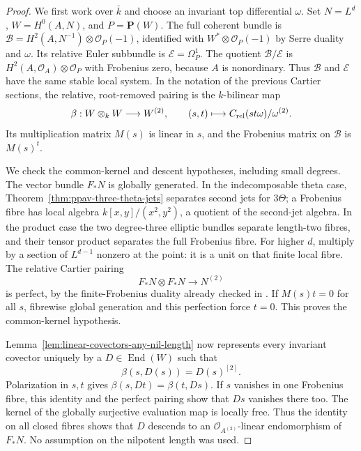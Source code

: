 \begin{proof}
We first work over $\bar k$ and choose an invariant top differential
$\omega$. Set $N=L^d$, $W=H^0(A,N)$, and $P=\mathbf P(W)$.
The full coherent bundle is
$\mathcal B=H^2(A,N^{-1})\otimes\mathcal O_P(-1)$, identified with
$W^*\otimes\mathcal O_P(-1)$ by Serre duality and $\omega$.
Its relative Euler subbundle is $\mathcal E=\Omega_P^1$.
The quotient $\mathcal B/\mathcal E$ is $H^2(A,\mathcal O_A)\otimes
\mathcal O_P$ with Frobenius zero, because $A$ is nonordinary.
Thus $\mathcal B$ and $\mathcal E$ have the same stable local system.
In the notation of the previous Cartier sections, the relative,
root-removed pairing is the $k$-bilinear map
\[
 \beta:W\otimes_kW\longrightarrow W^{(2)},\qquad
           (s,t)\longmapsto C_{\rm rel}(st\omega)/\omega^{(2)}.
\]
Its multiplication matrix $M(s)$ is linear in $s$, and the Frobenius
matrix on $\mathcal B$ is $M(s)^t$.

We check the common-kernel and descent hypotheses, including small
degrees. The vector bundle $F_*N$ is globally generated. In the
indecomposable theta case, Theorem~\ref{thm:ppav-three-theta-jets}
separates second jets for $3\Theta$; a Frobenius fibre has local
algebra $k[x,y]/(x^2,y^2)$, a quotient of the second-jet algebra.
In the product case the two degree-three elliptic bundles separate
length-two fibres, and their tensor product separates the full
Frobenius fibre. For higher $d$, multiply by a section of $L^{d-1}$
nonzero at the point: it is a unit on that finite local fibre.
The relative Cartier pairing
\[
                    F_*N\otimes F_*N\longrightarrow N^{(2)}
\]
is perfect, by the finite-Frobenius duality already checked in
\citet[Proposition~1.3.7 and Theorem~1.3.8, pp.~26--28]{BrionKumar2005}.
If $M(s)t=0$ for all $s$, fibrewise global generation and this
perfection force $t=0$. This proves the common-kernel hypothesis.

Lemma~\ref{lem:linear-covectors-any-nil-length} now represents every
invariant covector uniquely by a $D\in\operatorname{End}(W)$ such that
\begin{equation}\label{eq:nonordinary-exact-D}
                       \beta(s,D(s))=D(s)^{[2]}.
\end{equation}
Polarization in $s,t$ gives $\beta(s,Dt)=\beta(t,Ds)$.
If $s$ vanishes in one Frobenius fibre, this identity and the perfect
pairing show that $Ds$ vanishes there too. The kernel of the globally
surjective evaluation map is locally free. Thus the identity on all
closed fibres shows that $D$ descends to an
$\mathcal O_{A^{(2)}}$-linear endomorphism of $F_*N$.
No assumption on the nilpotent length was used.


\end{proof}
